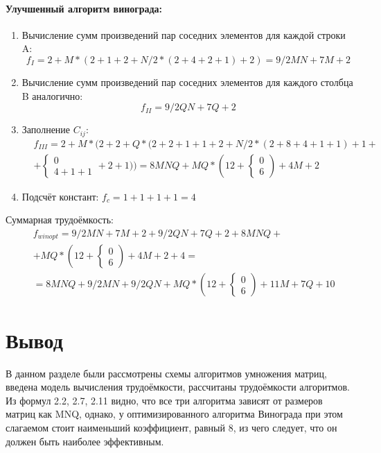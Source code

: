 \paragraph{Улучшенный алгоритм винограда:}
\begin{enumerate}[I]
	\item Вычисление сумм произведений пар соседних элементов для каждой строки A:
	\begin{equation}
	f_{I}=2+M*(2+1+2+N/2*(2+4+2+1)+2)=9/2MN+7M+2
	\end{equation}
	\item Вычисление сумм произведений пар соседних элементов для каждого столбца B аналогично:
	\begin{equation}
	f_{II}=9/2QN+7Q+2
	\end{equation}
	\item Заполнение $C_{ij}$:
	\begin{equation}
	\begin{split}
	&f_{III}=2+M*(2+2+Q*(2+2+1+1+2+N/2*(2+8+4+1+1)+1+\\
	&+\begin{cases}0\\4+1+1\end{cases}+2+1))=8MNQ+MQ*(12+\begin{cases}0\\6\end{cases})+4M+2
	\end{split}
	\end{equation}
	\item Подсчёт констант: $f_{c}=1+1+1+1=4$
\end{enumerate}
Суммарная трудоёмкость:
\begin{equation}
\begin{split}
&f_{winopt}=9/2MN+7M+2+9/2QN+7Q+2+8MNQ+\\
&+MQ*(12+\begin{cases}0\\6\end{cases})+4M+2+4=\\
&=8MNQ+9/2MN+9/2QN+MQ*(12+\begin{cases}0\\6\end{cases})+11M+7Q+10
\end{split}
\end{equation}
\section{Вывод}
\label{sec:design_conclusion}
В данном разделе были рассмотрены схемы алгоритмов умножения матриц, введена модель вычисления трудоёмкости, рассчитаны трудоёмкости алгоритмов. Из формул 2.2, 2.7, 2.11 видно, что все три алгоритма зависят от размеров матриц как MNQ, однако, у оптимизированного алгоритма Винограда при этом слагаемом стоит наименьший коэффициент, равный 8, из чего следует, что он должен быть наиболее эффективным.
